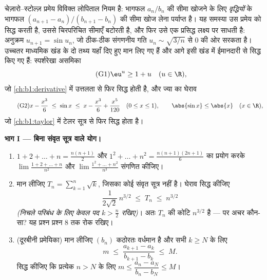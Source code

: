 \begin{problem}[{सप्ताहांत समस्या --- चेज़ारो--स्टोल्ज़ प्रमेय और $u_{n+1} = \sin
u_n$ के लिए अनंतस्पर्शी
$u_n \sim \sqrt{3/n}$}]
\label{pb:b1:seq:1}
चेज़ारो--स्टोल्ज़ प्रमेय विविक्त लोपिताल नियम है: भागफल $a_n/b_n$ की सीमा
खोजने के लिए \emph{वृद्धियों} के भागफल $(a_{n+1} - a_n)/(b_{n+1} - b_n)$ की
सीमा खोज लेना पर्याप्त है। यह समस्या उस प्रमेय को सिद्ध करती है, उससे
चिरपरिचित सीमाएँ बटोरती है, और फिर उसे एक प्रसिद्ध लक्ष्य पर साधती है:
अनुक्रम $u_{n+1} = \sin u_n$, जो ठीक-ठीक संगणनीय गति $u_n \sim \sqrt{3/n}$
से $0$ की ओर सरकता है। उच्चतर माध्यमिक खंड
के दो तथ्य यहाँ दिए हुए मान लिए गए हैं और आगे इसी खंड में ईमानदारी से सिद्ध
किए गए हैं: स्पर्शरेखा असमिका
\[
\tag{G1} \eu^{u} \geq 1 + u \quad (u \in \R),
\]
जो \cref{ch:b1:derivative} में उत्तलता से फिर सिद्ध होती है, और ज्या का
घेराव
\[
\tag{G2} x - \frac{x^3}{6} \;\leq\; \sin x \;\leq\; x -
\frac{x^3}{6} + \frac{x^5}{120} \quad (0 \leq x \leq 1), \qquad
\abs{\sin x} \leq \abs{x} \quad (x \in \R),
\]
जो \cref{ch:b1:taylor} में टेलर सूत्र से फिर सिद्ध होता है।

\medskip \noindent\textbf{भाग I --- बिना संवृत सूत्र वाले योग।}
\begin{enumerate}
  \item $1 + 2 + \dots + n = \frac{n(n+1)}{2}$ और $1^2 + \dots + n^2 =
  \frac{n(n+1)(2n+1)}{6}$ का प्रयोग करके $\lim \frac{1 + 2 + \dots +
  n}{n^2}$ और $\lim \frac{1^2 + \dots + n^2}{n^3}$ संगणित कीजिए।
  \item मान लीजिए $T_n = \sum_{k=1}^n \sqrt k$, जिसका कोई संवृत सूत्र नहीं
  है। घेराव सिद्ध कीजिए
        \[
        \frac{1}{2\sqrt 2}\,n^{3/2} \;\leq\; T_n \;\leq\;
        n^{3/2}
        \]
        \emph{(निचले परिबंध के लिए केवल पद $k > \frac n2$ रखिए)}। अतः $T_n$
        की कोटि $n^{3/2}$ है --- पर अचर कौन-सा? यह प्रश्न प्रश्न 8 तक रोक
        रखिए।
  \item (दूरबीनी प्रमेयिका) मान लीजिए $(b_n)$ कठोरतः वर्धमान है और सभी $k
  \geq N$ के लिए
        \[
        m \;\leq\; \frac{a_{k+1} - a_k}{b_{k+1} - b_k} \;\leq\;
        M .
        \]
        सिद्ध कीजिए कि प्रत्येक $n > N$ के लिए $m \leq \dfrac{a_n - a_N}{b_n
        - b_N} \leq M$।
\end{enumerate}


\end{problem}
